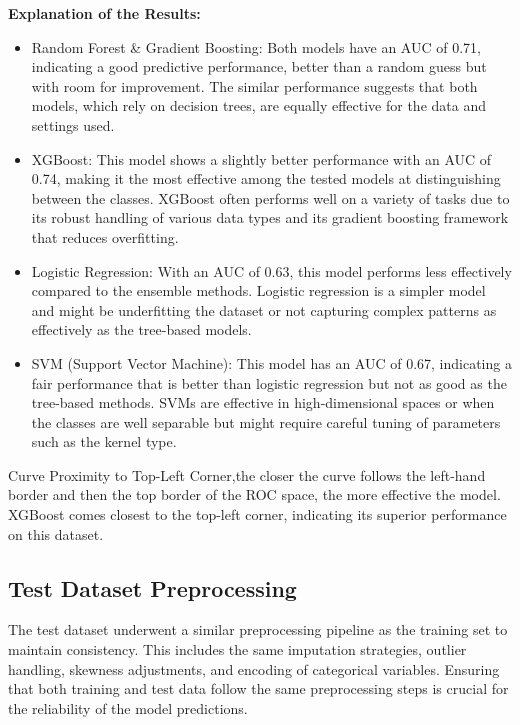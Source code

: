 \documentclass{article}
\begin{document}
\textbf{Explanation of the Results:}
\begin{itemize}
    \item Random Forest \& Gradient Boosting: Both models have an AUC of 0.71, indicating a good predictive performance, better than a random guess but with room for improvement. The similar performance suggests that both models, which rely on decision trees, are equally effective for the data and settings used.
    \item XGBoost: This model shows a slightly better performance with an AUC of 0.74, making it the most effective among the tested models at distinguishing between the classes. XGBoost often performs well on a variety of tasks due to its robust handling of various data types and its gradient boosting framework that reduces overfitting.
    
    \item Logistic Regression: With an AUC of 0.63, this model performs less effectively compared to the ensemble methods. Logistic regression is a simpler model and might be underfitting the dataset or not capturing complex patterns as effectively as the tree-based models.
    \item SVM (Support Vector Machine): This model has an AUC of 0.67, indicating a fair performance that is better than logistic regression but not as good as the tree-based methods. SVMs are effective in high-dimensional spaces or when the classes are well separable but might require careful tuning of parameters such as the kernel type.

    
    
\end{itemize}




Curve Proximity to Top-Left Corner,the closer the curve follows the left-hand border and then the top border of the ROC space, the more effective the model. XGBoost comes closest to the top-left corner, indicating its superior performance on this dataset.



\subsection{Test Dataset Preprocessing}
The test dataset underwent a similar preprocessing pipeline as the training set to maintain consistency. This includes the same imputation strategies, outlier handling, skewness adjustments, and encoding of categorical variables. Ensuring that both training and test data follow the same preprocessing steps is crucial for the reliability of the model predictions.
\end{document}
